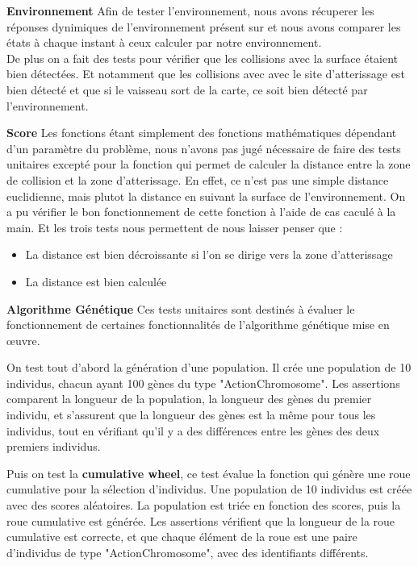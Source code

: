 \documentclass[french,a4paper,10pt,twocolumn]{article}
\begin{document}
\textbf{Environnement}
Afin de tester l'environnement, nous avons récuperer les réponses dynimiques de l'environnement présent sur \cite[CodinGame]{codingame_mars_lander} 
et nous avons comparer les états à chaque instant à ceux calculer par notre environnement.\\
De plus on a fait des tests pour vérifier que les collisions avec la surface étaient bien détectées. 
Et notamment que les collisions avec avec le site d'atterissage est bien détecté et que si le vaisseau 
sort de la carte, ce soit bien détecté par l'environnement.


\textbf{Score}
Les fonctions étant simplement des fonctions mathématiques dépendant d'un paramètre du problème, nous n'avons pas jugé nécessaire de faire des tests unitaires
excepté pour la fonction qui permet de calculer la distance entre la zone de collision et la zone d'atterissage.
En effet, ce n'est pas une simple distance euclidienne, mais plutot la distance en suivant la surface de l'environnement.
On a pu vérifier le bon fonctionnement de cette fonction à l'aide de cas caculé à la main.
Et les trois tests nous permettent de nous laisser penser que :
\begin{itemize}
    \item La distance est bien décroissante si l'on se dirige vers la zone d'atterissage
    \item La distance est bien calculée
\end{itemize}

\textbf{Algorithme Génétique}
Ces tests unitaires sont destinés à évaluer le fonctionnement de certaines fonctionnalités de l'algorithme génétique mise en œuvre.

On test tout d'abord la génération d'une population. Il crée une population de 10 individus, chacun ayant 100 gènes du type "ActionChromosome". 
Les assertions comparent la longueur de la population, la longueur des gènes du premier individu, 
et s'assurent que la longueur des gènes est la même pour tous les individus, tout en vérifiant qu'il y a des différences entre les gènes des deux premiers individus.
    
Puis on test la \textbf{cumulative wheel}, ce test évalue la fonction qui génère une roue cumulative pour la sélection d'individus. 
Une population de 10 individus est créée avec des scores aléatoires. 
La population est triée en fonction des scores, puis la roue cumulative est générée. 
Les assertions vérifient que la longueur de la roue cumulative est correcte, 
et que chaque élément de la roue est une paire d'individus de type "ActionChromosome", avec des identifiants différents.
\end{document}
